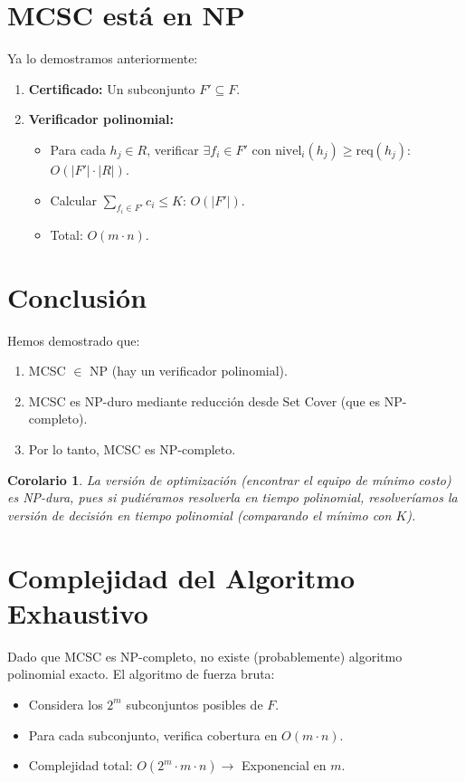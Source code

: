 \documentclass[11pt]{article}
\newtheorem{corollary}{Corolario}
\begin{document}
	\section{MCSC está en NP}
	
	Ya lo demostramos anteriormente:
	\begin{enumerate}
		\item \textbf{Certificado:} Un subconjunto $F' \subseteq F$.
		\item \textbf{Verificador polinomial:}
		\begin{itemize}
			\item Para cada $h_j \in R$, verificar $\exists f_i \in F'$ con $\text{nivel}_i(h_j) \geq \text{req}(h_j)$: $O(|F'| \cdot |R|)$.
			\item Calcular $\sum_{f_i \in F'} c_i \leq K$: $O(|F'|)$.
			\item Total: $O(m \cdot n)$.
		\end{itemize}
	\end{enumerate}

	\section{Conclusión}
	
	Hemos demostrado que:
	\begin{enumerate}
		\item MCSC $\in$ NP (hay un verificador polinomial).
		\item MCSC es NP-duro mediante reducción desde Set Cover (que es NP-completo).
		\item Por lo tanto, MCSC es NP-completo.
	\end{enumerate}
	
	\begin{corollary}
		La versión de optimización (encontrar el equipo de mínimo costo) es NP-dura, pues si pudiéramos resolverla en tiempo polinomial, resolveríamos la versión de decisión en tiempo polinomial (comparando el mínimo con $K$).
	\end{corollary}

	\section{Complejidad del Algoritmo Exhaustivo}
	
	Dado que MCSC es NP-completo, no existe (probablemente) algoritmo polinomial exacto. El algoritmo de fuerza bruta:
	\begin{itemize}
		\item Considera los $2^m$ subconjuntos posibles de $F$.
		\item Para cada subconjunto, verifica cobertura en $O(m \cdot n)$.
		\item Complejidad total: $O(2^m \cdot m \cdot n) \rightarrow$ Exponencial en $m$.
	\end{itemize}
	
\end{document}
